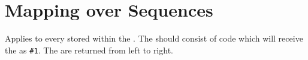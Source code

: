 \documentclass[oneside]{book}
\begin{document}
\section{Mapping over Sequences}



\begin{function}{\seqVarMapInline}
\begin{syntax}
  
\end{syntax}
Applies  to every  stored
within the . The  should
consist of code which will receive the  as \verb|#1|.
The  are returned from left to right.
\begin{demohigh}
\IgnoreSpacesOn
\seqSetFromClist {}
\tlClear \lTmpaTl
\seqVarMapInline {}
\tlUse \lTmpaTl
\IgnoreSpacesOff
\end{demohigh}
\end{function}

\end{document}
